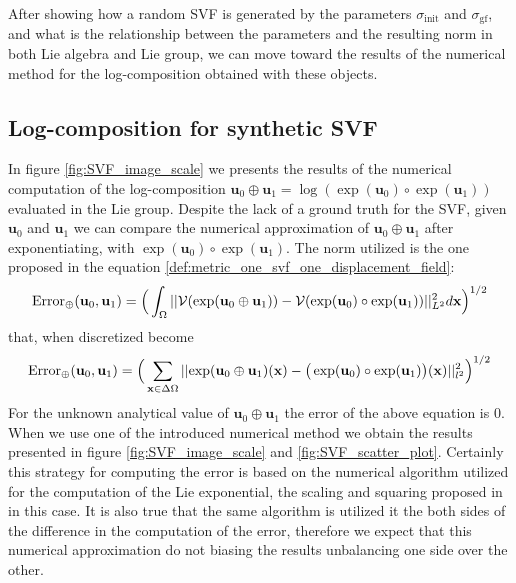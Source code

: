 After showing how a random SVF is generated by the parameters $\sigma_{\text{init}}$ and $\sigma_{\text{gf}}$, and what is the relationship between the parameters and the resulting norm in both Lie algebra and Lie group, we can move toward the results of the numerical method for the log-composition obtained with these objects.

\subsection{Log-composition for synthetic SVF}
In figure \ref{fig:SVF_image_scale} we presents the results of the numerical computation of the log-composition $\mathbf{u}_0\oplus\mathbf{u}_1 = \log(\exp(\mathbf{u}_0)\circ \exp(\mathbf{u}_1))$ evaluated in the Lie group. Despite the lack of a ground truth for the SVF, given $\mathbf{u}_0$ and  $\mathbf{u}_1$ we can compare the numerical approximation of $\mathbf{u}_0\oplus\mathbf{u}_1$ after exponentiating, with $\exp(\mathbf{u}_0)\circ \exp(\mathbf{u}_1)$. The norm utilized is the one proposed in the equation \ref{def:metric_one_svf_one_displacement_field}:
\begin{align}
\text{Error}_{\oplus}(\mathbf{u}_0, \mathbf{u}_1)
= 
\Big(\int_{\Omega} \vert\lvert \mathcal{V}(\exp(\mathbf{u}_0\oplus\mathbf{u}_1)) - \mathcal{V}(\exp(\mathbf{u}_0)\circ \exp(\mathbf{u}_1)) \rvert\vert_{L^2}^{2} d\mathbf{x} \Big)^{1/2}
\end{align} 
that, when discretized become
\begin{align}\label{eq:error_svf_sythetic_data}
\text{Error}_{\oplus}(\mathbf{u}_0, \mathbf{u}_1) 
= 
\Big( \sum_{\mathbf{x} \in \Delta\Omega} 
\vert\lvert \exp(\mathbf{u}_0\oplus\mathbf{u}_1)(\mathbf{x}) 
	-
\big(\exp(\mathbf{u}_0)\circ \exp(\mathbf{u}_1)\big)(\mathbf{x}) 
	   \rvert\vert_{l^2}^{2}  \Big)^{1/2}
\end{align} 
For the unknown analytical value of $\mathbf{u}_0\oplus\mathbf{u}_1$ the error of the above equation is $0$. When we use one of the introduced numerical method we obtain the results presented in figure \ref{fig:SVF_image_scale} and \ref{fig:SVF_scatter_plot}. Certainly this strategy for computing the error is based on the numerical algorithm utilized for the computation of the Lie exponential, the scaling and squaring proposed in \cite{arsigny2006log} in this case. It is also true that the same algorithm is utilized it the both sides of the difference in the computation of the error, therefore we expect that this numerical approximation do not biasing the results unbalancing one side over the other.

